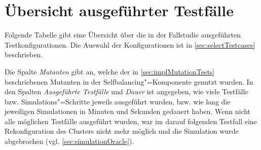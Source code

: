 \chapter{Übersicht ausgeführter Testfälle}
\label{app:overviewExecutedTestCases}

Folgende Tabelle gibt eine Übersicht über die in der Fallstudie ausgeführten Testkonfigurationen.
Die Auswahl der Konfigurationen ist in \autoref{sec:selectTestcases} beschrieben.

Die Spalte \emph{Mutanten} gibt an, welche der in \autoref{sec:implMutationTests} beschriebenen Mutanten in der Selfbalancing"=Komponente genutzt wurden.
In den Spalten \emph{Ausgeführte Testfälle} und \emph{Dauer} ist angegeben, wie viele Testfälle bzw. Simulations"=Schritte jeweils ausgeführt wurden, bzw. wie lang die jeweiligen Simulationen in Minuten und Sekunden gedauert haben.
Wenn nicht alle möglichen Testfälle ausgeführt wurden, war im darauf folgenden Testfall eine Rekonfiguration des Clusters nicht mehr möglich und die Simulation wurde abgebrochen (vgl. \autoref{sec:simulationOracle}).

